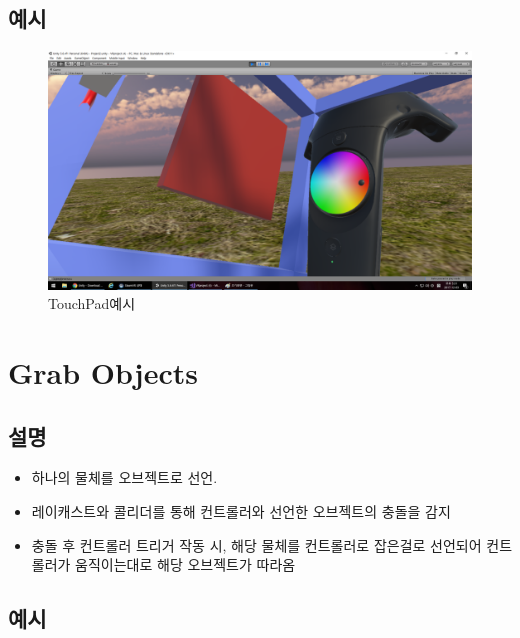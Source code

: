 \documentclass{report}
\begin{document}
    \subsection{예시}
    
    
    \begin{figure}[h!]
    \centering
    \includegraphics[width=1.0\textwidth]{vrtk2-1.jpg}
    \caption{TouchPad예시}
    \end{figure}
    
    \section{Grab Objects}
    \subsection{설명}
    
    \begin{itemize}
    
    \item 하나의 물체를 오브젝트로 선언.

    \item 레이캐스트와 콜리더를 통해 컨트롤러와 선언한 오브젝트의 충돌을 감지

    \item 충돌 후 컨트롤러 트리거 작동 시, 해당 물체를 컨트롤러로 잡은걸로 선언되어 컨트롤러가 움직이는대로 해당 오브젝트가 따라옴


    

    \end{itemize}
    
    \subsection{예시}
    
\end{document}
